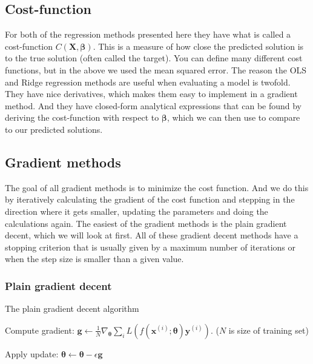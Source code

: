 \subsection{Cost-function}
{
    For both of the regression methods presented here they have what is called
    a cost-function $C(\boldsymbol{X}, \boldsymbol{\beta})$. This is a measure
    of how close the predicted solution is to the true solution (often called
    the target). You can define many different cost functions, but in the above
    we used the mean squared error. The reason the OLS and Ridge regression
    methods are useful when evaluating a model is twofold. They have nice
    derivatives, which makes them easy to implement in a gradient method. And
    they have closed-form analytical expressions that can be found by deriving
    the cost-function with respect to $\boldsymbol{\beta}$, which we can then
    use to compare to our predicted solutions.
}

\subsection{Gradient methods}
The goal of all gradient methods is to minimize the cost function. And we do
this by iteratively calculating the gradient of the cost function and stepping
in the direction where it gets smaller, updating the parameters and doing the
calculations again. The easiest of the gradient methods is the plain gradient
decent, which we will look at first. All of these gradient decent methods have
a stopping criterion that is usually given by a maximum number of iterations or
when the step size is smaller than a given value.

\subsubsection{Plain gradient decent}
\begin{algorithm}
\caption{The plain gradient decent algorithm}\label{algo:plain_gd}
\begin{algorithmic}
    
        
        Compute gradient: $\boldsymbol{g}\gets \frac{1}{N}\nabla_{\boldsymbol\theta}
        \sum_{i}L(f(\boldsymbol{x}^{(i)};\boldsymbol{\theta})\boldsymbol{y}^{(i)})$.
        ($N$ is size of training set)

        Apply update: $\boldsymbol\theta \gets \boldsymbol\theta
        -\epsilon\boldsymbol{g}$
    \EndWhile
\end{algorithmic}
\end{algorithm}

